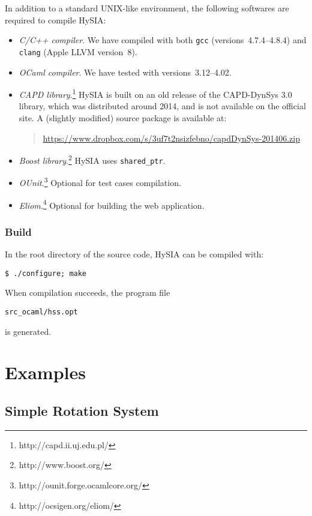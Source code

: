 \documentclass[12pt,a4paper]{article}
\begin{document}
In addition to a standard UNIX-like environment, the following softwares are required to compile HySIA:
\begin{itemize}
    \item \emph{C/C++ compiler}.
        We have compiled with both \verb|gcc| (versions~4.7.4–4.8.4) and \verb|clang| (Apple LLVM version~8).
    \item \emph{OCaml compiler}.
        We have tested with versions~3.12–4.02.
    \item \emph{CAPD library}.\footnote{http://capd.ii.uj.edu.pl/}
        HySIA is built on an old release of the CAPD-DynSys 3.0 library, which was distributed around 2014, and is not available on the official site.
        A (slightly modified) source package is available at:
        \begin{quote}\small
        \hspace{-4em}
        \url{https://www.dropbox.com/s/3uf7t2nsizfebno/capdDynSys-201406.zip}
        \end{quote}
    \item \emph{Boost library}.\footnote{http://www.boost.org/}
        HySIA uses \verb|shared_ptr|.
    \item \emph{OUnit}.\footnote{http://ounit.forge.ocamlcore.org/} Optional for test cases compilation.
    \item \emph{Eliom}.\footnote{http://ocsigen.org/eliom/} Optional for building the web application.
\end{itemize}


\subsubsection*{Build}

In the root directory of the source code, HySIA can be compiled with:
\begin{verbatim}
$ ./configure; make
\end{verbatim}

When compilation succeeds, the program file
\begin{verbatim}
src_ocaml/hss.opt
\end{verbatim}
is generated.


\section{Examples}

\subsection{Simple Rotation System}
\end{document}
